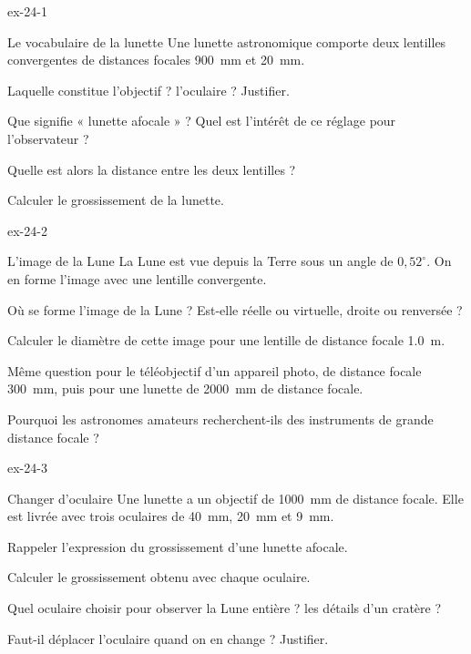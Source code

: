 \begin{blocLivre}{ex-24-1}
\begin{exercice}[1]{Le vocabulaire de la lunette}
Une lunette astronomique comporte deux lentilles convergentes de distances focales \qty{900}{mm} et \qty{20}{mm}.
\begin{questions}
\item Laquelle constitue l'objectif ? l'oculaire ? Justifier.
\item Que signifie « lunette afocale » ? Quel est l'intérêt de ce réglage pour l'observateur ?
\item Quelle est alors la distance entre les deux lentilles ?
\item Calculer le grossissement de la lunette.
\end{questions}
\end{exercice}
\end{blocLivre}
\begin{blocLivre}{ex-24-2}
\begin{exercice}[1]{L'image de la Lune}
La Lune est vue depuis la Terre sous un angle de $0{,}52^\circ$. On en forme l'image avec une lentille convergente.
\begin{questions}
\item Où se forme l'image de la Lune ? Est-elle réelle ou virtuelle, droite ou renversée ?
\item Calculer le diamètre de cette image pour une lentille de distance focale \qty{1,0}{m}.
\item Même question pour le téléobjectif d'un appareil photo, de distance focale \qty{300}{mm}, puis pour une lunette de
\qty{2000}{mm} de distance focale.
\item Pourquoi les astronomes amateurs recherchent-ils des instruments de grande distance focale ?
\end{questions}
\end{exercice}
\end{blocLivre}
\begin{blocLivre}{ex-24-3}
\begin{exercice}[1]{Changer d'oculaire}
Une lunette a un objectif de \qty{1000}{mm} de distance focale. Elle est livrée avec trois oculaires de \qty{40}{mm},
\qty{20}{mm} et \qty{9}{mm}.
\begin{questions}
\item Rappeler l'expression du grossissement d'une lunette afocale.
\item Calculer le grossissement obtenu avec chaque oculaire.
\item Quel oculaire choisir pour observer la Lune entière ? les détails d'un cratère ?
\item Faut-il déplacer l'oculaire quand on en change ? Justifier.
\end{questions}
\end{exercice}
\end{blocLivre}
